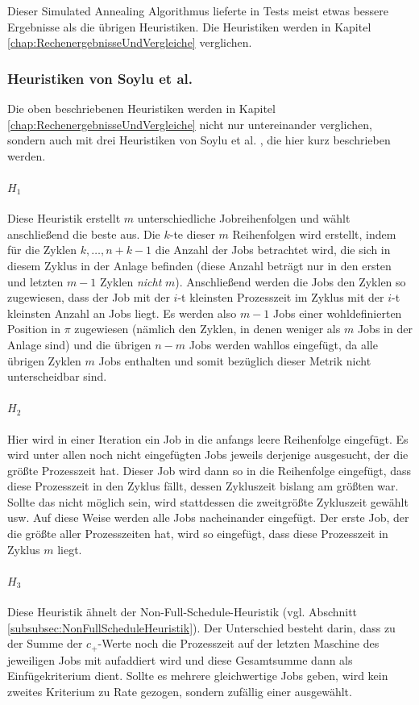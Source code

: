 \documentclass{scrreprt}
\begin{document}
Dieser Simulated Annealing Algorithmus lieferte in Tests meist etwas bessere Ergebnisse als die übrigen Heuristiken.
Die Heuristiken werden in Kapitel \ref{chap:RechenergebnisseUndVergleiche} verglichen.

\subsubsection{Heuristiken von Soylu et al.}
Die oben beschriebenen Heuristiken werden in Kapitel \ref{chap:RechenergebnisseUndVergleiche} nicht nur untereinander verglichen, 
sondern auch mit drei Heuristiken von Soylu et al. \cite{soylu}, die hier kurz beschrieben werden.

\paragraph{$H_1$}
Diese Heuristik erstellt $m$ unterschiedliche Jobreihenfolgen und wählt anschließend die beste aus.
Die $k$-te dieser $m$ Reihenfolgen wird erstellt, indem für die Zyklen $k,\ldots,n+k-1$ die Anzahl der Jobs betrachtet wird,
die sich in diesem Zyklus in der Anlage befinden (diese Anzahl beträgt nur in den ersten und letzten $m-1$ Zyklen \textit{nicht} $m$).
Anschließend werden die Jobs den Zyklen so zugewiesen, dass der Job mit der $i$-t kleinsten Prozesszeit im Zyklus mit der $i$-t kleinsten Anzahl an Jobs liegt.
Es werden also $m-1$ Jobs einer wohldefinierten Position in $\pi$ zugewiesen (nämlich den Zyklen, in denen weniger als $m$ Jobs in der Anlage sind) 
und die übrigen $n-m$ Jobs werden wahllos eingefügt, da alle übrigen Zyklen $m$ Jobs enthalten und somit bezüglich dieser Metrik nicht unterscheidbar sind.

\paragraph{$H_2$}
Hier wird in einer Iteration ein Job in die anfangs leere Reihenfolge eingefügt.
Es wird unter allen noch nicht eingefügten Jobs jeweils derjenige ausgesucht, der die größte Prozesszeit hat.
Dieser Job wird dann so in die Reihenfolge eingefügt, dass diese Prozesszeit in den Zyklus fällt, dessen Zykluszeit bislang am größten war.
Sollte das nicht möglich sein, wird stattdessen die zweitgrößte Zykluszeit gewählt usw.
Auf diese Weise werden alle Jobs nacheinander eingefügt. 
Der erste Job, der die größte aller Prozesszeiten hat, wird so eingefügt, dass diese Prozesszeit in Zyklus $m$ liegt.

\paragraph{$H_3$}
Diese Heuristik ähnelt der Non-Full-Schedule-Heuristik (vgl. Abschnitt \ref{subsubsec:NonFullScheduleHeuristik}).
Der Unterschied besteht darin, dass zu der Summe der $c_+$-Werte noch die Prozesszeit auf der letzten Maschine des jeweiligen Jobs mit aufaddiert wird
und diese Gesamtsumme dann als Einfügekriterium dient.
Sollte es mehrere gleichwertige Jobs geben, wird kein zweites Kriterium zu Rate gezogen, sondern zufällig einer ausgewählt.
\end{document}
